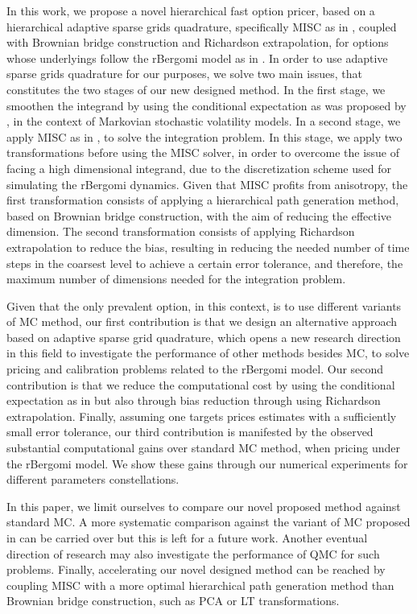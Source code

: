 In this work,  we propose a novel hierarchical fast option pricer,  based on a  hierarchical adaptive sparse grids quadrature, specifically  MISC as in  \cite{haji2016multi}, coupled with Brownian bridge construction and Richardson extrapolation, for options whose underlyings  follow the rBergomi model as in \cite{bayer2016pricing}.  In order to use  adaptive sparse grids quadrature for our purposes, we solve two main issues, that constitutes the two stages of our new designed method. In the first stage, we smoothen the integrand by using the conditional expectation as was proposed by \cite{romano1997contingent}, in the context of Markovian stochastic volatility  models.   In a second stage, we apply  MISC as in \cite{haji2016multi}, to solve the integration problem. In this stage, we apply two transformations before using the MISC solver, in order to overcome the issue of facing a high dimensional integrand, due to the discretization scheme used for simulating the rBergomi dynamics. Given that MISC profits from anisotropy, the first transformation consists of applying a hierarchical  path generation method, based on Brownian
bridge construction, with the aim of reducing the effective dimension. The second transformation consists of applying Richardson extrapolation to reduce the bias, resulting in reducing the needed number of time steps in the coarsest level to achieve a certain error tolerance, and therefore,  the maximum number of dimensions needed for the integration problem.

Given that the only prevalent option, in this context, is to use different variants of MC method, our first contribution  is that we design an alternative approach based on  adaptive sparse grid quadrature, which opens a new research direction in this field to investigate the performance of other methods besides MC, to solve pricing and calibration problems related to the rBergomi model. Our second contribution is that we reduce the computational cost  by using the conditional expectation as in \cite{mccrickerd2017turbocharging} but also through bias reduction through using Richardson extrapolation. Finally, assuming one targets prices estimates with a sufficiently small error tolerance, our third contribution is manifested by the observed substantial computational gains  over standard MC method, when pricing under the rBergomi model. We show  these gains through our numerical experiments for  different parameters constellations. 

In this paper, we limit ourselves to compare our novel proposed method against standard MC. A more systematic comparison against the variant of MC proposed in \cite{mccrickerd2017turbocharging}  can be carried over but this is left for a future work. Another  eventual direction of research may also investigate the performance of QMC for such problems. Finally, accelerating  our novel designed method can be reached  by coupling MISC with a more optimal hierarchical path generation method than Brownian bridge construction, such as PCA or LT transformations.